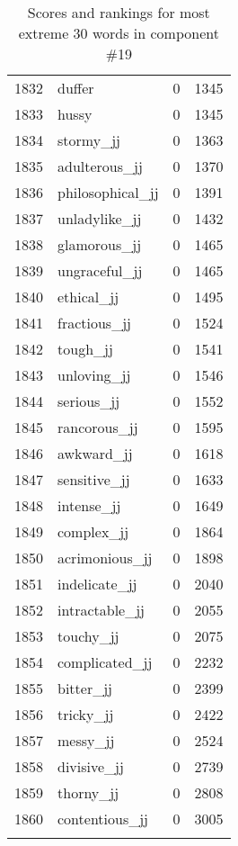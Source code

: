 \begin{longtable}[!htbp]{| rlr@{.}l |}
    1832 & duffer & 0 & 1345 \\
    1833 & hussy & 0 & 1345 \\
    1834 & stormy\_jj & 0 & 1363 \\
    1835 & adulterous\_jj & 0 & 1370 \\
    1836 & philosophical\_jj & 0 & 1391 \\
    1837 & unladylike\_jj & 0 & 1432 \\
    1838 & glamorous\_jj & 0 & 1465 \\
    1839 & ungraceful\_jj & 0 & 1465 \\
    1840 & ethical\_jj & 0 & 1495 \\
    1841 & fractious\_jj & 0 & 1524 \\
    1842 & tough\_jj & 0 & 1541 \\
    1843 & unloving\_jj & 0 & 1546 \\
    1844 & serious\_jj & 0 & 1552 \\
    1845 & rancorous\_jj & 0 & 1595 \\
    1846 & awkward\_jj & 0 & 1618 \\
    1847 & sensitive\_jj & 0 & 1633 \\
    1848 & intense\_jj & 0 & 1649 \\
    1849 & complex\_jj & 0 & 1864 \\
    1850 & acrimonious\_jj & 0 & 1898 \\
    1851 & indelicate\_jj & 0 & 2040 \\
    1852 & intractable\_jj & 0 & 2055 \\
    1853 & touchy\_jj & 0 & 2075 \\
    1854 & complicated\_jj & 0 & 2232 \\
    1855 & bitter\_jj & 0 & 2399 \\
    1856 & tricky\_jj & 0 & 2422 \\
    1857 & messy\_jj & 0 & 2524 \\
    1858 & divisive\_jj & 0 & 2739 \\
    1859 & thorny\_jj & 0 & 2808 \\
    1860 & contentious\_jj & 0 & 3005 \\
    \hline
    \caption{Scores and rankings for most extreme 30 words in component \#19} \\
\end{longtable}
